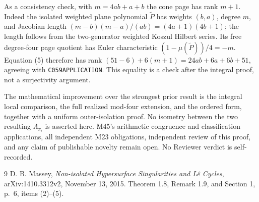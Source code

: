 \documentclass[11pt]{article}
\begin{document}
As a consistency check, with \(m=4ab+a+b\) the cone page has
rank \(m+1\). Indeed the isolated weighted plane polynomial
\(\widetilde P\) has weights \((b,a)\), degree \(m\), and
Jacobian length
\((m-b)(m-a)/(ab)=(4a+1)(4b+1)\); the length follows
from the two-generator weighted Koszul Hilbert series.
Its free degree-four page quotient has Euler characteristic
\((1-\mu(\widetilde P))/4=-m\).
Equation (5) therefore has rank
\((51-6)+6(m+1)=24ab+6a+6b+51\), agreeing with
\texttt{C059APPLICATION}. This equality is a check after the
integral proof, not a surjectivity argument.

The mathematical improvement over the strongest prior result is
the integral local comparison, the full realized mod-four
extension, and the ordered form, together with a uniform
outer-isolation proof. No isometry between the two resulting
\(\Lambda_{\pi_i}\) is asserted here. M45's arithmetic congruence
and classification applications, all independent M23 obligations,
independent review of this proof, and any claim of publishable
novelty remain open. No Reviewer verdict is self-recorded.

\begin{thebibliography}{9}
D. B. Massey, \emph{Non-isolated Hypersurface Singularities and
L\^e Cycles}, arXiv:1410.3312v2, November 13, 2015.
Theorem 1.8, Remark 1.9, and Section 1, p.~6, items (2)--(5).
\end{thebibliography}
\end{document}
